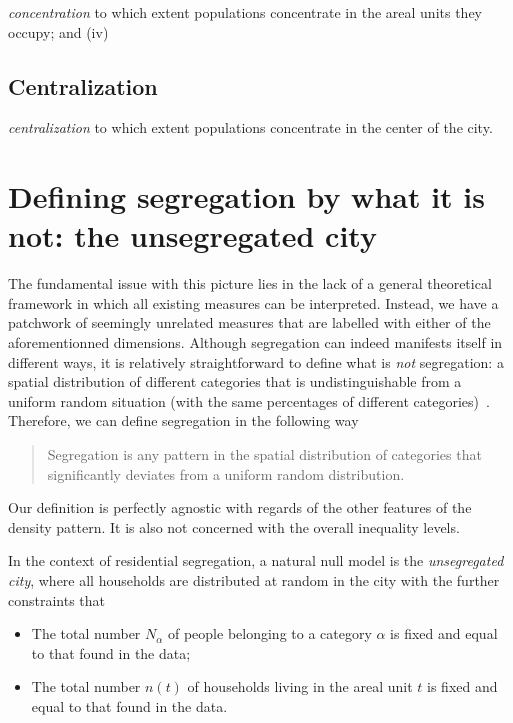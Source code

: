 {\it concentration} to which extent populations
concentrate in the areal units they occupy; and (iv) 

\subsection{Centralization}
\label{sub:centralization}

{\it centralization} to
which extent populations concentrate in the center of the city.\\


\section{Defining segregation by what it is not: the unsegregated city}
\label{sec:null_model_the_unsegregated_city}

The fundamental issue with this picture lies in the lack of a general theoretical framework
in which all existing measures can be interpreted.  Instead, we have a
patchwork of seemingly unrelated measures that are labelled with
either of the aforementionned dimensions. Although segregation can
indeed manifests itself in different ways, it is relatively
straightforward to define what is \emph{not} segregation: a spatial
distribution of different categories that is undistinguishable from a
uniform random situation (with the same percentages of different
categories)~\cite{Jahn:1947}. Therefore, we can define segregation in the following way 

\begin{quote}
Segregation is any pattern in the spatial distribution of categories that significantly 
deviates from a uniform random distribution. 
\end{quote} 

Our definition is perfectly agnostic with regards of the other features of the
density pattern. It is also not concerned with the overall inequality levels. 


In the context of residential segregation, a natural null model is the
\emph{unsegregated city}, where all households are distributed at
random in the city with the further constraints that

\begin{itemize}
    \item The total number $N_\alpha$ of people belonging to a category
	    $\alpha$ is fixed and equal to that found in the data;
    \item The total number $n(t)$ of households living in the areal unit $t$ is
	    fixed and equal to that found in the data.
\end{itemize}

